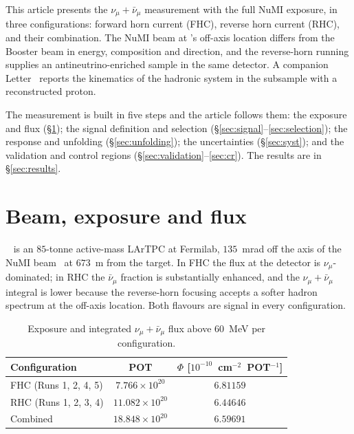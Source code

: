 \documentclass[aps,prd,twocolumn,superscriptaddress,nofootinbib,floatfix]{revtex4-2}
\begin{document}
This article presents the $\nu_\mu+\bar\nu_\mu$ measurement with the full \uboone{} NuMI exposure,
in three configurations: forward horn current (FHC), reverse horn current (RHC), and their
combination. The NuMI beam at \uboone{}'s off-axis location differs from the Booster beam in
energy, composition and direction, and the reverse-horn running supplies an antineutrino-enriched
sample in the same detector. A companion Letter~\cite{companion_prl} reports the kinematics of the
hadronic system in the subsample with a reconstructed proton.

The measurement is built in five steps and the article follows them: the exposure and flux
(\S\ref{sec:flux}); the signal definition and selection (\S\ref{sec:signal}--\ref{sec:selection});
the response and unfolding (\S\ref{sec:unfolding}); the uncertainties (\S\ref{sec:syst}); and the
validation and control regions (\S\ref{sec:validation}--\ref{sec:cr}). The results are in
\S\ref{sec:results}.

\section{Beam, exposure and flux}
\label{sec:flux}

\uboone{}~\cite{uboone_nim} is an $85$-tonne active-mass LArTPC at Fermilab, $135$~mrad off the
axis of the NuMI beam~\cite{numi_beam} at $673$~m from the target. In FHC the flux at the detector
is $\nu_\mu$-dominated; in RHC the $\bar\nu_\mu$ fraction is substantially enhanced, and the
$\nu_\mu+\bar\nu_\mu$ integral is lower because the reverse-horn focusing accepts a softer hadron
spectrum at the off-axis location. Both flavours are signal in every configuration.

\begin{table}[b]
  \caption{Exposure and integrated $\nu_\mu+\bar\nu_\mu$ flux above $60$~MeV per configuration.}
  \label{tab:exposure}
  \begin{ruledtabular}
  \begin{tabular}{lcc}
    Configuration & POT & $\Phi$ [$10^{-10}$~cm$^{-2}$~POT$^{-1}$] \\
    \hline
    FHC (Runs 1, 2, 4, 5) & $7.766\times10^{20}$ & $6.81159$ \\
    RHC (Runs 1, 2, 3, 4) & $11.082\times10^{20}$ & $6.44646$ \\
    Combined & $18.848\times10^{20}$ & $6.59691$ \\
  \end{tabular}
  \end{ruledtabular}
\end{table}
\end{document}
